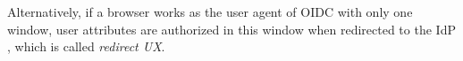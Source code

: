 Alternatively, if a browser works as the user agent of OIDC with only one window,
        user attributes are authorized in this window when redirected to the IdP \cite{OpenIDConnect,rfc6749}, 
        which is called \emph{redirect UX}.


\begin{table*}[tb]
    \caption{Privacy-preserving solutions of SSO and identity federation}
\end{table*}
